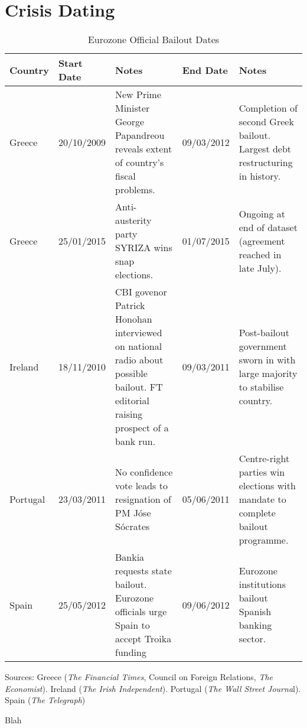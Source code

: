 \documentclass[/../base.tex]{subfiles}
\begin{document}
\section{Crisis Dating}
\label{a:crisis_dates}

\begin{table}[H]
	\centering
	\begin{threeparttable}
		\caption{Eurozone Official Bailout Dates}
		\centering
		\begin{tabular}{l l p{5cm} l p{5cm}}
			\toprule
			\toprule
			Country & Start Date & Notes & End Date & Notes \\
			\midrule
			Greece & 20/10/2009 & New Prime Minister George Papandreou reveals extent of country's fiscal problems. & 09/03/2012 & Completion of second Greek bailout. Largest debt restructuring in history. \\
			Greece & 25/01/2015 & Anti-austerity party SYRIZA wins snap elections. & 01/07/2015 & Ongoing at end of dataset (agreement reached in late July). \\
			Ireland & 18/11/2010 & CBI govenor Patrick Honohan interviewed on national radio about possible bailout. FT editorial raising prospect of a bank run. & 09/03/2011 & Post-bailout government sworn in with large majority to stabilise country. \\
			Portugal & 23/03/2011 & No confidence vote leads to resignation of PM J\'{o}se S\'{o}crates & 05/06/2011 & Centre-right parties win elections with mandate to complete bailout programme. \\	
			Spain & 25/05/2012 & Bankia requests state bailout. Eurozone officials urge Spain to accept Troika funding & 09/06/2012 & Eurozone institutions bailout Spanish banking sector. \\		
			\bottomrule
			\bottomrule
		\end{tabular}
		\begin{tablenotes}
			\small
			\item Sources: Greece (\textit{The Financial Times}, Council on Foreign Relations, \textit{The Economist}). Ireland (\textit{The Irish Independent}). Portugal (\textit{The Wall Street Journa}l). Spain (\textit{The Telegraph})
		\end{tablenotes}
		\label{tab:bailout_dates}
	\end{threeparttable}
\end{table}

\color{white} Blah
\end{document}
